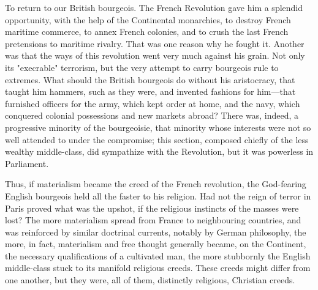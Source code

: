 To return to our British bourgeois. The French Revolution gave him a splendid
opportunity, with the help of the Continental monarchies, to destroy French
maritime commerce, to annex French colonies, and to crush the last French
pretensions to maritime rivalry. That was one reason why he fought it. Another
was that the ways of this revolution went very much against his grain. Not only
its "execrable" terrorism, but the very attempt to carry bourgeois rule to
extremes. What should the British bourgeois do without his aristocracy, that
taught him hammers, such as they were, and invented fashions for him---that
furnished officers for the army, which kept order at home, and the navy, which
conquered colonial possessions and new markets abroad? There was, indeed, a
progressive minority of the bourgeoisie, that minority whose interests were not
so well attended to under the compromise; this section, composed chiefly of the
less wealthy middle-class, did sympathize with the Revolution, but it was
powerless in Parliament.

Thus, if materialism became the creed of the French revolution, the God-fearing
English bourgeois held all the faster to his religion. Had not the reign of
terror in Paris proved what was the upshot, if the religious instincts of the
masses were lost? The more materialism spread from France to neighbouring
countries, and was reinforced by similar doctrinal currents, notably by German
philosophy, the more, in fact, materialism and free thought generally became, on
the Continent, the necessary qualifications of a cultivated man, the more
stubbornly the English middle-class stuck to its manifold religious creeds.
These creeds might differ from one another, but they were, all of them,
distinctly religious, Christian creeds.

